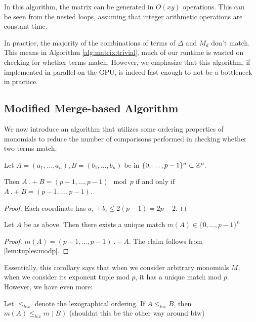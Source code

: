 In this algorithm, the matrix can be generated in 
$O(xy)$ operations. 
This can be
seen from the nested loops, assuming that integer arithmetic operations are constant time.

In practice, the majority of the combinations of terms of $\Delta$ and $M_{d}$ don't match. This means in
Algorithm \ref{alg:matrix:trivial}, much of our runtime is wasted on checking for whether terms match.
However, we emphasize that this algorithm, if implemented in parallel on the GPU, is indeed
fast enough to not be a bottleneck in practice.

\subsection{Modified Merge-based Algorithm}

We now introduce an algorithm that utilizes some ordering properties of monomials to reduce the number of comparisons 
performed in checking whether two terms match.

\begin{lem}
	\label{lem:tuples:modp}
	Let \(A = (a_{1}, \ldots, a_{n}),
	B = (b_{1}, \ldots, b_{n})\)
	be in \(\{0, \ldots, p-1\}^{n} \subset \mathbb{Z}^{n}\).

	Then \(A ~.+ B = 
	(p-1, \ldots, p-1) \mod p\)
	if and only if 
	\(A ~.+ B = 
	(p-1, \ldots, p-1)\).
\end{lem}

\begin{proof}
	Each coordinate has \(a_{i} + b_{i} \leq 2(p-1) = 2p-2\).
\end{proof}

\begin{cor}
    \label{cor:unique:match}
	Let $A$ be as above.
	Then there exists a unique
	match \(m(A) \in \{0, \ldots, p-1\}^{n}\) 
\end{cor}

\begin{proof}
	\(m(A) = 
	(p-1, \ldots, p-1) ~.- A\).
	The claim follows from 
	\ref{lem:tuples:modp}.
\end{proof}

Essentially, this corollary says that
when we consider arbitrary monomials \(M\),
when we consider its exponent tuple 
mod \(p\), it has a unique
match mod \(p\).
However, we have even more:

\begin{cor}
	\label{cor:match:order}
	Let \(\leq_{lex}\) denote the 
	lexographical ordering.
	If \(A \leq_{lex} B\),
	then 
	\(m(A) \leq_{lex} m(B)\)
    (shouldnt this be the other way around btw)
\end{cor}

